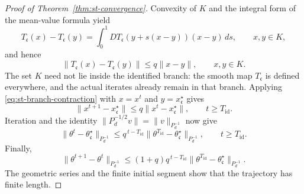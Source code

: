 \begin{proof}[Proof of Theorem~\ref{thm:st-convergence}]
Convexity of $K$ and the integral form of the mean-value
formula yield
\[
    T_{\mathfrak c}(x)-T_{\mathfrak c}(y)
    =
    \int_0^1
        DT_{\mathfrak c}(y+s(x-y))(x-y)\,ds,
    \qquad x,y\in K,
\]
and hence
\begin{equation}
    \|T_{\mathfrak c}(x)-T_{\mathfrak c}(y)\|
    \leq q\|x-y\|,
    \qquad x,y\in K.
    \label{eq:st-branch-contraction}
\end{equation}
The set $K$ need not lie inside the identified branch:
the smooth map $T_{\mathfrak c}$ is defined everywhere,
and the actual iterates already remain in that branch.
Applying \eqref{eq:st-branch-contraction} with
$x=x^t$ and $y=x_{\mathfrak c}^\star$ gives
\[
    \|x^{t+1}-x_{\mathfrak c}^\star\|
    \leq q\|x^t-x_{\mathfrak c}^\star\|,
    \qquad t\geq T_{\mathrm{id}}.
\]
Iteration and the identity
$\|P_d^{-1/2}v\|=\|v\|_{P_d^{-1}}$ now give
\[
    \|\theta^t-\theta_{\mathfrak c}^\star\|_{P_d^{-1}}
    \leq
    q^{\,t-T_{\mathrm{id}}}
    \|\theta^{T_{\mathrm{id}}}
        -\theta_{\mathfrak c}^\star\|_{P_d^{-1}},
    \qquad t\geq T_{\mathrm{id}}.
\]
Finally,
\[
    \|\theta^{t+1}-\theta^t\|_{P_d^{-1}}
    \leq
    (1+q)q^{\,t-T_{\mathrm{id}}}
    \|\theta^{T_{\mathrm{id}}}
        -\theta_{\mathfrak c}^\star\|_{P_d^{-1}}.
\]
The geometric series and the finite initial segment show
that the trajectory has finite length.
\end{proof}
